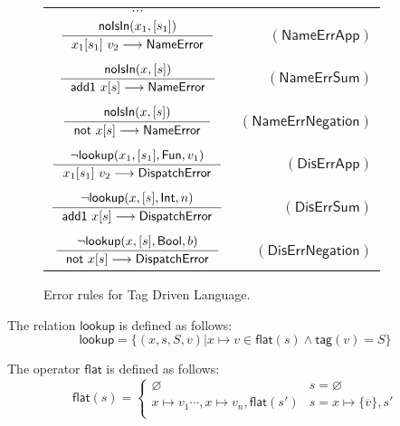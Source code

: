 \documentclass[preprint,authoryear,sort&compress,9pt,nocopyrightspace]{article}
\newcommand\rulename[1]{\mathsf{(#1)}}
\newcommand{\tto}{\longrightarrow}
\newcommand{\negacion}[1]{\mathsf{not} \ #1}
\newcommand{\suma}[1]{\mathsf{add1} \ #1}
\newcommand{\lab}{\mathsf{tag}}
\newcommand{\boolt}{\mathsf{Bool}}
\newcommand{\intt}{\mathsf{Int}}
\newcommand{\funt}{\mathsf{Fun}}
\newcommand{\noisin}{\mathsf{noIsIn}}
\newcommand{\buscar}{\mathsf{lookup}}
\newcommand{\nameerror}{\mathsf{NameError}}
\newcommand{\dispatcherror}{\mathsf{DispatchError}}
\newcommand{\semanticB}{Tag Driven Language}
\begin{document}
\begin{figure}[h]
\begin{small}
\begin{center}
\begin{tabular}{|c r|}
\hline
$\cdots$&\\
$\inference{ \noisin(x_1, [s_1])}{x_1[s_1] \ v_2 \tto  \nameerror}$&$\rulename{NameErrApp}$\\
&\\
$\inference{ \noisin(x, [s])}{\suma{x[s]} \tto \nameerror}$&$\rulename{NameErrSum}$\\
&\\
$\inference{ \noisin(x, [s])}{\negacion{x[s]} \tto \nameerror}$&$\rulename{NameErrNegation}$\\
&\\
$\inference{ \neg \buscar(x_1, [s_1],\funt, v_1)}{x_1[s_1] \ v_2 \tto  \dispatcherror}$&$\rulename{DisErrApp}$\\
&\\
$\inference{\neg \buscar(x, [s], \intt, n)}{\suma{x[s]} \tto \dispatcherror}$&$\rulename{DisErrSum}$\\
&\\
$\inference{\neg \buscar(x, [s], \boolt, b)}{\negacion{x[s]} \tto \dispatcherror}$&$\rulename{DisErrNegation}$\\
\hline
\end{tabular}
\caption{Error rules for \semanticB.}
\label{tabla:errorRules2}
\end{center}
\end{small}
\end{figure}

\begin{definition}[$\buscar$]
\label{definition:tcs}
\mbox{}
The relation $\buscar$ is defined  as follows:
\[ \buscar  = \{(x, s, S, v)| x \mapsto v \in \mathsf{flat}(s) \wedge \lab(v) = S\}
\]
\end{definition}

\begin{definition}
\label{definition:tcs}
\mbox{}
The operator $\mathsf{flat}$ is defined  as follows:
\[ \mathsf{flat}(s) = \begin{cases} 
      \varnothing & s =  \varnothing \\
      x \mapsto v_1 \cdots , x \mapsto v_n,\mathsf{flat} (s') & s = x \mapsto \{\overline{v}\}, s'\\
   \end{cases}
\]
\end{definition}
\end{document}
